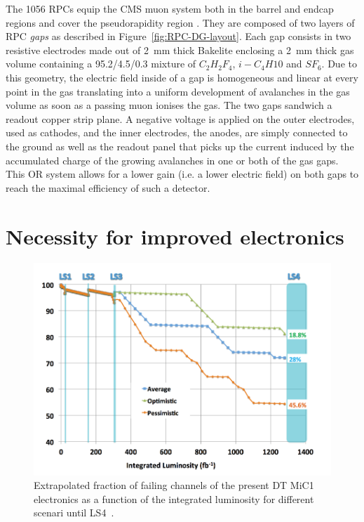 	The 1056 RPCs equip the CMS muon system both in the barrel and endcap regions and cover the pseudorapidity region . They are composed of two layers of RPC \textit{gaps} as described in Figure~\ref{fig:RPC-DG-layout}. Each gap consists in two resistive electrodes made out of \SI{2}{mm} thick Bakelite enclosing a \SI{2}{mm} thick gas volume containing a 95.2/4.5/0.3 mixture of $C_2H_2F_4$, $i-C_4H10$ and $SF_6$. Due to this geometry, the electric field inside of a gap is homogeneous and linear at every point in the gas translating into a uniform development of avalanches in the gas volume as soon as a passing muon ionises the gas. The two gaps sandwich a readout copper strip plane. A negative voltage is applied on the outer electrodes, used as cathodes, and the inner electrodes, the anodes, are simply connected to the ground as well as the readout panel that picks up the current induced by the accumulated charge of the growing avalanches in one or both of the gas gaps. This OR system allows for a lower gain (i.e. a lower electric field) on both gaps to reach the maximal efficiency of such a detector.
	
\endgroup
	
\section{Necessity for improved electronics}
\label{chapt3:sec:electronics}

\begingroup\setlength{\intextsep}{0pt}\setlength{\columnsep}{15pt}

	\begin{figure}
		\centering
		\includegraphics[width=\linewidth]{fig/chapt3/DT-channel-failure.png}
		\caption{\label{fig:DT-failure} Extrapolated fraction of failing channels of the present DT MiC1 electronics as a function of the integrated luminosity for different scenari until LS4~\cite{PHASEIITP}.}
	\end{figure}

